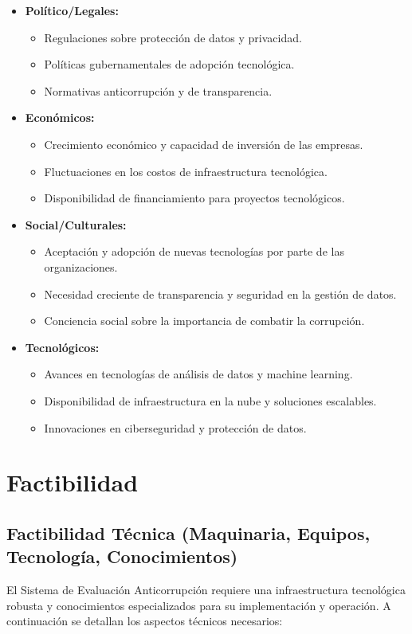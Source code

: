 \documentclass[a4paper,12pt]{article}
\begin{document}
\begin{itemize}
    \item \textbf{Político/Legales:}
    \begin{itemize}
        \item Regulaciones sobre protección de datos y privacidad.
        \item Políticas gubernamentales de adopción tecnológica.
        \item Normativas anticorrupción y de transparencia.
    \end{itemize}
    \item \textbf{Económicos:}
    \begin{itemize}
        \item Crecimiento económico y capacidad de inversión de las empresas.
        \item Fluctuaciones en los costos de infraestructura tecnológica.
        \item Disponibilidad de financiamiento para proyectos tecnológicos.
    \end{itemize}
    \item \textbf{Social/Culturales:}
    \begin{itemize}
        \item Aceptación y adopción de nuevas tecnologías por parte de las organizaciones.
        \item Necesidad creciente de transparencia y seguridad en la gestión de datos.
        \item Conciencia social sobre la importancia de combatir la corrupción.
    \end{itemize}
    \item \textbf{Tecnológicos:}
    \begin{itemize}
        \item Avances en tecnologías de análisis de datos y machine learning.
        \item Disponibilidad de infraestructura en la nube y soluciones escalables.
        \item Innovaciones en ciberseguridad y protección de datos.
    \end{itemize}
\end{itemize}

\section{Factibilidad}
\subsection{Factibilidad Técnica (Maquinaria, Equipos, Tecnología, Conocimientos)}
El Sistema de Evaluación Anticorrupción requiere una infraestructura tecnológica robusta y conocimientos especializados para su implementación y operación. A continuación se detallan los aspectos técnicos necesarios:
\end{document}
